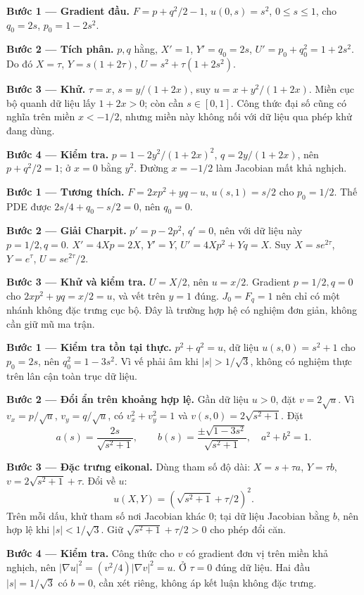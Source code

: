 \textbf{Bước 1 — Gradient đầu.} $F=p+q^2/2-1$, $u(0,s)=s^2$, $0\le s\le1$, cho $q_0=2s$, $p_0=1-2s^2$.

\textbf{Bước 2 — Tích phân.} $p,q$ hằng, $X'=1$, $Y'=q_0=2s$, $U'=p_0+q_0^2=1+2s^2$. Do đó $X=\tau$, $Y=s(1+2\tau)$, $U=s^2+\tau(1+2s^2)$.

\textbf{Bước 3 — Khử.} $\tau=x$, $s=y/(1+2x)$, suy $u=x+y^2/(1+2x)$. Miền cục bộ quanh dữ liệu lấy $1+2x>0$; còn cần $s\in[0,1]$. Công thức đại số cũng có nghĩa trên miền $x<-1/2$, nhưng miền này không nối với dữ liệu qua phép khử đang dùng.

\textbf{Bước 4 — Kiểm tra.} $p=1-2y^2/(1+2x)^2$, $q=2y/(1+2x)$, nên $p+q^2/2=1$; ở $x=0$ bằng $y^2$. Đường $x=-1/2$ làm Jacobian mất khả nghịch.

\textbf{Bước 1 — Tương thích.} $F=2xp^2+yq-u$, $u(s,1)=s/2$ cho $p_0=1/2$. Thế PDE được $2s/4+q_0-s/2=0$, nên $q_0=0$.

\textbf{Bước 2 — Giải Charpit.} $p'=p-2p^2$, $q'=0$, nên với dữ liệu này $p=1/2,q=0$. $X'=4Xp=2X$, $Y'=Y$, $U'=4Xp^2+Yq=X$. Suy $X=se^{2\tau}$, $Y=e^\tau$, $U=se^{2\tau}/2$.

\textbf{Bước 3 — Khử và kiểm tra.} $U=X/2$, nên $u=x/2$. Gradient $p=1/2,q=0$ cho $2xp^2+yq=x/2=u$, và vết trên $y=1$ đúng. $J_0=F_q=1$ nên chỉ có một nhánh không đặc trưng cục bộ. Đây là trường hợp hệ có nghiệm đơn giản, không cần giữ mũ ma trận.

\textbf{Bước 1 — Kiểm tra tồn tại thực.} $p^2+q^2=u$, dữ liệu $u(s,0)=s^2+1$ cho $p_0=2s$, nên $q_0^2=1-3s^2$. Vì vế phải âm khi $|s|>1/\sqrt3$, không có nghiệm thực trên lân cận toàn trục dữ liệu.

\textbf{Bước 2 — Đổi ẩn trên khoảng hợp lệ.} Gần dữ liệu $u>0$, đặt $v=2\sqrt u$. Vì $v_x=p/\sqrt u$, $v_y=q/\sqrt u$, có $v_x^2+v_y^2=1$ và $v(s,0)=2\sqrt{s^2+1}$. Đặt
\[a(s)=\frac{2s}{\sqrt{s^2+1}},\qquad b(s)=\frac{\pm\sqrt{1-3s^2}}{\sqrt{s^2+1}},\quad a^2+b^2=1.\]

\textbf{Bước 3 — Đặc trưng eikonal.} Dùng tham số độ dài: $X=s+\tau a$, $Y=\tau b$, $v=2\sqrt{s^2+1}+\tau$. Đổi về $u$:
\[u(X,Y)=(\sqrt{s^2+1}+\tau/2)^2.\]
Trên mỗi dấu, khử tham số nơi Jacobian khác 0; tại dữ liệu Jacobian bằng $b$, nên hợp lệ khi $|s|<1/\sqrt3$. Giữ $\sqrt{s^2+1}+\tau/2>0$ cho phép đổi căn.

\textbf{Bước 4 — Kiểm tra.} Công thức cho $v$ có gradient đơn vị trên miền khả nghịch, nên $|\nabla u|^2=(v^2/4)|\nabla v|^2=u$. Ở $\tau=0$ đúng dữ liệu. Hai đầu $|s|=1/\sqrt3$ có $b=0$, cần xét riêng, không áp kết luận không đặc trưng.

